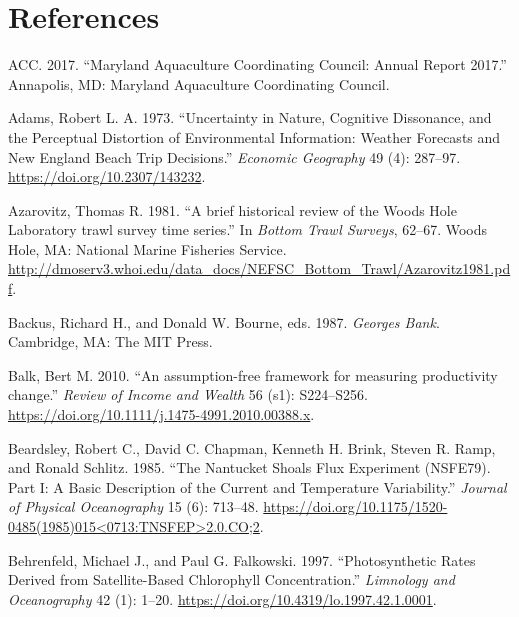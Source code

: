 \documentclass[
]{book}
\begin{document}
\hypertarget{references}{%
\chapter*{References}\label{references}}

\hypertarget{refs}{}
\leavevmode\hypertarget{ref-ACC2017}{}%
ACC. 2017. ``Maryland Aquaculture Coordinating Council: Annual Report 2017.'' Annapolis, MD: Maryland Aquaculture Coordinating Council.

\leavevmode\hypertarget{ref-adams_uncertainty_1973}{}%
Adams, Robert L. A. 1973. ``Uncertainty in Nature, Cognitive Dissonance, and the Perceptual Distortion of Environmental Information: Weather Forecasts and New England Beach Trip Decisions.'' \emph{Economic Geography} 49 (4): 287--97. \url{https://doi.org/10.2307/143232}.

\leavevmode\hypertarget{ref-Azarovitz1981}{}%
Azarovitz, Thomas R. 1981. ``A brief historical review of the Woods Hole Laboratory trawl survey time series.'' In \emph{Bottom Trawl Surveys}, 62--67. Woods Hole, MA: National Marine Fisheries Service. \url{http://dmoserv3.whoi.edu/data_docs/NEFSC_Bottom_Trawl/Azarovitz1981.pdf}.

\leavevmode\hypertarget{ref-backus_georges_1987}{}%
Backus, Richard H., and Donald W. Bourne, eds. 1987. \emph{Georges Bank}. Cambridge, MA: The MIT Press.

\leavevmode\hypertarget{ref-Balk2010}{}%
Balk, Bert M. 2010. ``An assumption-free framework for measuring productivity change.'' \emph{Review of Income and Wealth} 56 (s1): S224--S256. \url{https://doi.org/10.1111/j.1475-4991.2010.00388.x}.

\leavevmode\hypertarget{ref-beardsley_nantucket_1985}{}%
Beardsley, Robert C., David C. Chapman, Kenneth H. Brink, Steven R. Ramp, and Ronald Schlitz. 1985. ``The Nantucket Shoals Flux Experiment (NSFE79). Part I: A Basic Description of the Current and Temperature Variability.'' \emph{Journal of Physical Oceanography} 15 (6): 713--48. \href{https://doi.org/10.1175/1520-0485(1985)015\%3C0713:TNSFEP\%3E2.0.CO;2}{https://doi.org/10.1175/1520-0485(1985)015\textless{}0713:TNSFEP\textgreater{}2.0.CO;2}.

\leavevmode\hypertarget{ref-SOE1}{}%
Behrenfeld, Michael J., and Paul G. Falkowski. 1997. ``Photosynthetic Rates Derived from Satellite-Based Chlorophyll Concentration.'' \emph{Limnology and Oceanography} 42 (1): 1--20. \url{https://doi.org/10.4319/lo.1997.42.1.0001}.
\end{document}
